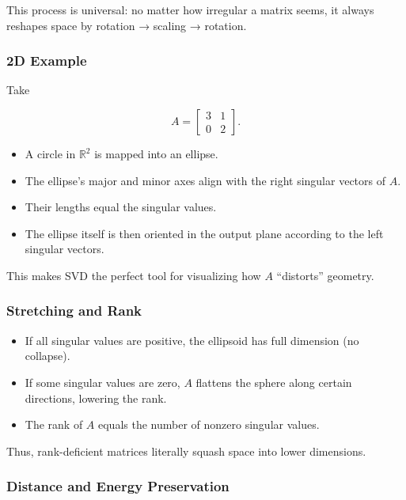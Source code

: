 \documentclass[
  letterpaper,
  DIV=11,
  numbers=noendperiod]{scrreprt}
\providecommand{\tightlist}{%
  \setlength{\itemsep}{0pt}\setlength{\parskip}{0pt}}
\begin{document}
This process is universal: no matter how irregular a matrix seems, it
always reshapes space by rotation → scaling → rotation.

\subsubsection{2D Example}\label{d-example}

Take

\[
A = \begin{bmatrix}3 & 1 \\ 0 & 2\end{bmatrix}.
\]

\begin{itemize}
\tightlist
\item
  A circle in \(\mathbb{R}^2\) is mapped into an ellipse.
\item
  The ellipse's major and minor axes align with the right singular
  vectors of \(A\).
\item
  Their lengths equal the singular values.
\item
  The ellipse itself is then oriented in the output plane according to
  the left singular vectors.
\end{itemize}

This makes SVD the perfect tool for visualizing how \(A\) ``distorts''
geometry.

\subsubsection{Stretching and Rank}\label{stretching-and-rank}

\begin{itemize}
\tightlist
\item
  If all singular values are positive, the ellipsoid has full dimension
  (no collapse).
\item
  If some singular values are zero, \(A\) flattens the sphere along
  certain directions, lowering the rank.
\item
  The rank of \(A\) equals the number of nonzero singular values.
\end{itemize}

Thus, rank-deficient matrices literally squash space into lower
dimensions.

\subsubsection{Distance and Energy
Preservation}\label{distance-and-energy-preservation}
\end{document}
